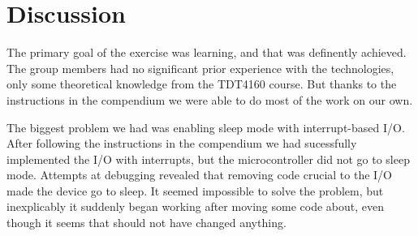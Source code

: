 \section{Discussion}
The primary goal of the exercise was learning, and that was definently achieved. The group members had no significant prior experience with the technologies, only some theoretical knowledge from the TDT4160 course. But thanks to the instructions in the compendium we were able to do most of the work on our own.

The biggest problem we had was enabling sleep mode with interrupt-based I/O. After following the instructions in the compendium we had sucessfully implemented the I/O with interrupts, but the microcontroller did not go to sleep mode. Attempts at debugging revealed that removing code crucial to the I/O made the device go to sleep. It seemed impossible to solve the problem, but inexplicably it suddenly began working after moving some code about, even though it seems that should not have changed anything.
